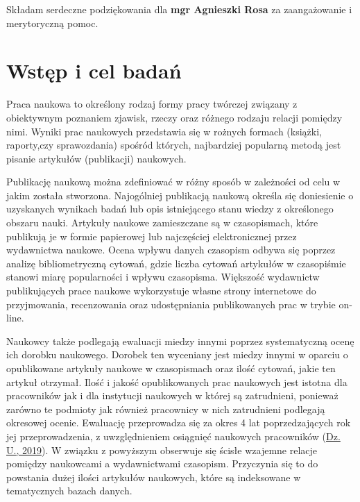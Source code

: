 \documentclass[
  12pt,
]{article}
\begin{document}
Składam serdeczne podziękowania dla \textbf{mgr Agnieszki Rosa} za
zaangażowanie i merytoryczną pomoc.

\newpage
{}
\setcounter{tocdepth}{2}
\tableofcontents
{}

\newpage

\newpage
{}

\hypertarget{wstux119p-i-cel-badaux144}{%
\section{\texorpdfstring{Wstęp i cel
badań\label{label1}}{Wstęp i cel badań}}\label{wstux119p-i-cel-badaux144}}

Praca naukowa to określony rodzaj formy pracy twórczej związany z
obiektywnym poznaniem zjawisk, rzeczy oraz różnego rodzaju relacji
pomiędzy nimi. Wyniki prac naukowych przedstawia się w rożnych formach
(książki, raporty,czy sprawozdania) spośród których, najbardziej
popularną metodą jest pisanie artykułów (publikacji) naukowych.

Publikację naukową można zdefiniować w różny sposób w zależności od celu
w jakim została stworzona. Najogólniej publikacją naukową określa się
doniesienie o uzyskanych wynikach badań lub opis istniejącego stanu
wiedzy z określonego obszaru nauki. Artykuły naukowe zamieszczane są w
czasopismach, które publikują je w formie papierowej lub najczęściej
elektronicznej przez wydawnictwa naukowe. Ocena wpływu danych czasopism
odbywa się poprzez analizę bibliometryczną cytowań, gdzie liczba cytowań
artykułów w czasopiśmie stanowi miarę popularności i wpływu czasopisma.
Większość wydawnictw publikujących prace naukowe wykorzystuje własne
strony internetowe do przyjmowania, recenzowania oraz udostępniania
publikowanych prac w trybie on-line.

Naukowcy także podlegają ewaluacji miedzy innymi poprzez systematyczną
ocenę ich dorobku naukowego. Dorobek ten wyceniany jest miedzy innymi w
oparciu o opublikowane artykuły naukowe w czasopismach oraz ilość
cytowań, jakie ten artykuł otrzymał. Ilość i jakość opublikowanych prac
naukowych jest istotna dla pracowników jak i dla instytucji naukowych w
której są zatrudnieni, ponieważ zarówno te podmioty jak również
pracownicy w nich zatrudnieni podlegają okresowej ocenie. Ewaluację
przeprowadza się za okres 4 lat poprzedzających rok jej przeprowadzenia,
z uwzględnieniem osiągnięć naukowych pracowników
(\protect\hyperlink{ref-dz.u.2019}{Dz. U., 2019}). W związku z powyższym
obserwuje się ścisłe wzajemne relacje pomiędzy naukowcami a
wydawnictwami czasopism. Przyczynia się to do powstania dużej ilości
artykułów naukowych, które są indeksowane w tematycznych bazach danych.
\end{document}
